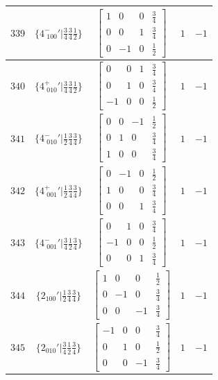 \documentclass[fleqn,8pt]{jsarticle}
\begin{document}
\begin{longtable}{ccccc}
$ 339 $ & $ \{4^{-}_{\,\,100}{}'|\frac{3}{4} \frac{3}{4} \frac{1}{2}\} $ & $ \begin{bmatrix} 1 & 0 & 0 & \frac{3}{4} \\ 0 & 0 & 1 & \frac{3}{4} \\ 0 & -1 & 0 & \frac{1}{2} \end{bmatrix} $ & $ 1 $ & $ -1 $ \\ \hline
$ 340 $ & $ \{4^{+}_{\,\,010}{}'|\frac{3}{4} \frac{3}{4} \frac{1}{2}\} $ & $ \begin{bmatrix} 0 & 0 & 1 & \frac{3}{4} \\ 0 & 1 & 0 & \frac{3}{4} \\ -1 & 0 & 0 & \frac{1}{2} \end{bmatrix} $ & $ 1 $ & $ -1 $ \\ \hline
$ 341 $ & $ \{4^{-}_{\,\,010}{}'|\frac{1}{2} \frac{3}{4} \frac{3}{4}\} $ & $ \begin{bmatrix} 0 & 0 & -1 & \frac{1}{2} \\ 0 & 1 & 0 & \frac{3}{4} \\ 1 & 0 & 0 & \frac{3}{4} \end{bmatrix} $ & $ 1 $ & $ -1 $ \\ \hline
$ 342 $ & $ \{4^{+}_{\,\,001}{}'|\frac{1}{2} \frac{3}{4} \frac{3}{4}\} $ & $ \begin{bmatrix} 0 & -1 & 0 & \frac{1}{2} \\ 1 & 0 & 0 & \frac{3}{4} \\ 0 & 0 & 1 & \frac{3}{4} \end{bmatrix} $ & $ 1 $ & $ -1 $ \\ \hline
$ 343 $ & $ \{4^{-}_{\,\,001}{}'|\frac{3}{4} \frac{1}{2} \frac{3}{4}\} $ & $ \begin{bmatrix} 0 & 1 & 0 & \frac{3}{4} \\ -1 & 0 & 0 & \frac{1}{2} \\ 0 & 0 & 1 & \frac{3}{4} \end{bmatrix} $ & $ 1 $ & $ -1 $ \\ \hline
$ 344 $ & $ \{2{}_{100}{}'|\frac{1}{2} \frac{3}{4} \frac{3}{4}\} $ & $ \begin{bmatrix} 1 & 0 & 0 & \frac{1}{2} \\ 0 & -1 & 0 & \frac{3}{4} \\ 0 & 0 & -1 & \frac{3}{4} \end{bmatrix} $ & $ 1 $ & $ -1 $ \\ \hline
$ 345 $ & $ \{2{}_{010}{}'|\frac{3}{4} \frac{1}{2} \frac{3}{4}\} $ & $ \begin{bmatrix} -1 & 0 & 0 & \frac{3}{4} \\ 0 & 1 & 0 & \frac{1}{2} \\ 0 & 0 & -1 & \frac{3}{4} \end{bmatrix} $ & $ 1 $ & $ -1 $ \\ \hline

\end{longtable}
\end{document}
